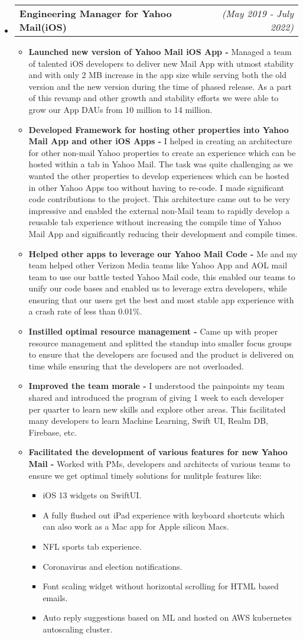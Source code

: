 \documentclass[a4paper,11pt,times]{res}
\makeatletter
\newcommand{\smalitem}[1]{\item #1 \vspace{-4pt}}
\newcommand{\mysubheading}[2]{
\begin{tabular*}{172mm}{l@{\extracolsep{\fill}}r}
		\textbf{#1} & \textit{#2} \\
\end{tabular*}\vspace{-1pt}}
\makeatother
\begin{document}
\begin{itemize}
\vspace{2pt}

\item
\mysubheading{Engineering Manager for Yahoo Mail(iOS) }{(May 2019 - July 2022)}
\begin{itemize}
\vspace{-2pt}
\smalitem{\textbf{Launched new version of Yahoo Mail iOS App -} Managed a team of talented iOS developers to deliver new Mail App with utmost stability and with only 2 MB increase in the app size while serving both the old version and the new version during the time of phased release. As a part of this revamp and other growth and stability efforts we were able to grow our App DAUs from 10 million to 14 million.}
\smalitem{\textbf{Developed Framework for hosting other properties into Yahoo Mail App and other iOS Apps -} I helped in creating an architecture for other non-mail Yahoo properties to create an experience which can be hosted within a tab in Yahoo Mail. The task was quite challenging as we wanted the other properties to develop experiences which can be hosted in other Yahoo Apps too without having to re-code. I made significant code contributions to the project. This architecture came out to be very impressive and enabled the external non-Mail team to rapidly develop a reusable tab experience without increasing the compile time of Yahoo Mail App and significantly reducing their development and compile times.}
\smalitem{\textbf{Helped other apps to leverage our Yahoo Mail Code -} Me and my team helped other Verizon Media teams like Yahoo App and AOL mail team to use our battle tested Yahoo Mail code, this enabled our teams to unify our code bases and enabled us to leverage extra developers, while ensuring that our users get the best and most stable app experience with a crash rate of less than 0.01\%. }
\smalitem{\textbf{Instilled optimal resource management -} Came up with proper resource management and splitted the standup into smaller focus groups to ensure that the developers are focused and the product is delivered on time while ensuring that the developers are not overloaded.}
\smalitem{\textbf{Improved the team morale -} I understood the painpoints my team shared and introduced the program of giving 1 week to each developer per quarter to learn new skills and explore other areas. This facilitated many developers to learn Machine Learning, Swift UI, Realm DB, Firebase, etc.}
\smalitem{\textbf{Facilitated the development of various features for new Yahoo Mail -} Worked with PMs, developers and architects of various teams to ensure we get optimal timely solutions for mulitple features like:
\begin{itemize}
\smalitem {iOS 13 widgets on SwiftUI.}
\smalitem {A fully flushed out iPad experience with keyboard shortcuts which can also work as a Mac app for Apple silicon Macs.}
\smalitem {NFL sports tab experience.}
\smalitem {Coronavirus and election notifications.}
\smalitem {Font scaling widget without horizontal scrolling for HTML based emails.}
\smalitem {Auto reply suggestions based on ML and hosted on AWS kubernetes autoscaling cluster.}
\end{itemize}
 }


\end{itemize}
\end{itemize}
\end{document}
